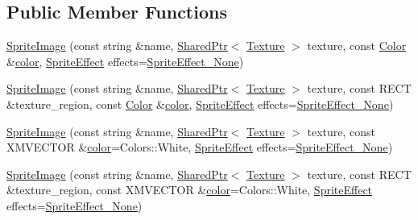 \subsection*{Public Member Functions}
\begin{DoxyCompactItemize}
\item 
\hyperlink{classmage_1_1_sprite_image_a11448d089eb7a52002faa59fe6600182}{Sprite\+Image} (const string \&name, \hyperlink{namespacemage_a1e01ae66713838a7a67d30e44c67703e}{Shared\+Ptr}$<$ \hyperlink{classmage_1_1_texture}{Texture} $>$ texture, const \hyperlink{structmage_1_1_color}{Color} \&\hyperlink{namespacemage_a56eceea5a9bceb2b56073f3ea4945781}{color}, \hyperlink{namespacemage_a9cfe18123066ba4236f548f9de75d881}{Sprite\+Effect} effects=\hyperlink{namespacemage_a9cfe18123066ba4236f548f9de75d881af3c275fbfacfe174da928b2f24dfa515}{Sprite\+Effect\+\_\+\+None})
\item 
\hyperlink{classmage_1_1_sprite_image_a709554823e08e369dda15b290ef9f9d6}{Sprite\+Image} (const string \&name, \hyperlink{namespacemage_a1e01ae66713838a7a67d30e44c67703e}{Shared\+Ptr}$<$ \hyperlink{classmage_1_1_texture}{Texture} $>$ texture, const R\+E\+CT \&texture\+\_\+region, const \hyperlink{structmage_1_1_color}{Color} \&\hyperlink{namespacemage_a56eceea5a9bceb2b56073f3ea4945781}{color}, \hyperlink{namespacemage_a9cfe18123066ba4236f548f9de75d881}{Sprite\+Effect} effects=\hyperlink{namespacemage_a9cfe18123066ba4236f548f9de75d881af3c275fbfacfe174da928b2f24dfa515}{Sprite\+Effect\+\_\+\+None})
\item 
\hyperlink{classmage_1_1_sprite_image_a0b18feb55a4a9c2c8ac5fad2a3fbf1cb}{Sprite\+Image} (const string \&name, \hyperlink{namespacemage_a1e01ae66713838a7a67d30e44c67703e}{Shared\+Ptr}$<$ \hyperlink{classmage_1_1_texture}{Texture} $>$ texture, const X\+M\+V\+E\+C\+T\+OR \&\hyperlink{namespacemage_a56eceea5a9bceb2b56073f3ea4945781}{color}=Colors\+::\+White, \hyperlink{namespacemage_a9cfe18123066ba4236f548f9de75d881}{Sprite\+Effect} effects=\hyperlink{namespacemage_a9cfe18123066ba4236f548f9de75d881af3c275fbfacfe174da928b2f24dfa515}{Sprite\+Effect\+\_\+\+None})
\item 
\hyperlink{classmage_1_1_sprite_image_a060e0679c4d2e8ad2c094fa316d58ce6}{Sprite\+Image} (const string \&name, \hyperlink{namespacemage_a1e01ae66713838a7a67d30e44c67703e}{Shared\+Ptr}$<$ \hyperlink{classmage_1_1_texture}{Texture} $>$ texture, const R\+E\+CT \&texture\+\_\+region, const X\+M\+V\+E\+C\+T\+OR \&\hyperlink{namespacemage_a56eceea5a9bceb2b56073f3ea4945781}{color}=Colors\+::\+White, \hyperlink{namespacemage_a9cfe18123066ba4236f548f9de75d881}{Sprite\+Effect} effects=\hyperlink{namespacemage_a9cfe18123066ba4236f548f9de75d881af3c275fbfacfe174da928b2f24dfa515}{Sprite\+Effect\+\_\+\+None})

\end{DoxyCompactItemize}
